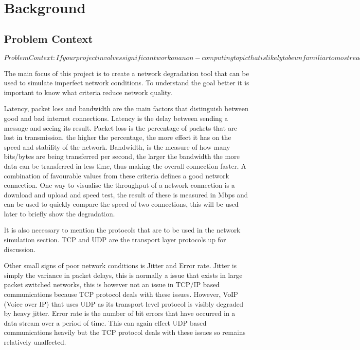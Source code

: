 \chapter{Background}
\section{Problem Context}
$Problem Context:
If your project involves significant work on a non-computing topic that is likely to be unfamiliar to most readers (e.g. linguistics, fluid dynamics) you should describe the important principles, concepts and terminology of that subject area in some detail. You will have had to learn these yourself in getting to grips with this unfamiliar topic and you should summarize what you learnt to enable the reader to understand your subsequent discussion on your project work and how this relates to the wider topic area.
$

The main focus of this project is to create a network degradation tool that can be used to simulate imperfect network conditions. To understand the goal better it is important to know what criteria reduce network quality.

Latency, packet loss and bandwidth are the main factors that distinguish between good and bad internet connections. Latency is the delay between sending a message and seeing its result. Packet loss is the percentage of packets that are lost in transmission, the higher the percentage, the more effect it has on the speed and stability of the network. Bandwidth, is the measure of how many bits/bytes are being transferred per second, the larger the bandwidth the more data can be transferred in less time, thus making the overall connection faster. A combination of favourable values from these criteria defines a good network connection. One way to visualise the throughput of a network connection is a download and upload and speed test, the result of these is measured in Mbps and can be used to quickly compare the speed of two connections, this will be used later to briefly show the degradation.

It is also necessary to mention the protocols that are to be used in the network simulation section. TCP \citep{TCP} and UDP \citep{UDP} are the transport layer protocols up for discussion. 

Other small signs of poor network conditions is Jitter and Error rate. Jitter is simply the variance in packet delays, this is normally a issue that exists in large packet switched networks, this is however not an issue in TCP/IP based communications because TCP protocol deals with these issues. However, VoIP (Voice over IP) that uses UDP as its transport level protocol is visibly degraded by heavy jitter. Error rate is the number of bit errors that have occurred in a data stream over a period of time. This can again effect UDP based communications heavily but the TCP protocol deals with these issues so remains relatively unaffected.


